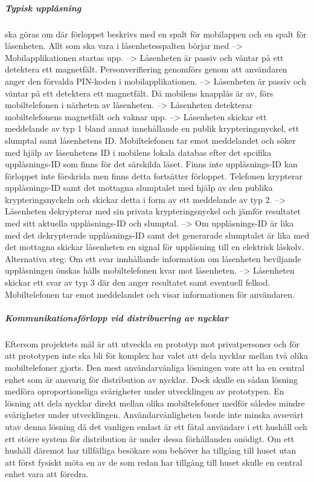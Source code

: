 \documentclass[11pt]{article}
\begin{document}
\subparagraph{Typisk upplåsning}
ska göras om där förloppet beskrivs med en spalt för mobilappen och en spalt för låsenheten. Allt som ska vara i låsenhetesspalten börjar med  --> 
Mobilapplikationen startas upp. --> Låsenheten är passiv och väntar på ett detektera ett magnetfält. 
Personverifiering genomförs genom att användaren anger den förvalda PIN-koden i mobilapplikationen. --> Låsenheten är passiv och väntar på ett detektera ett magnetfält. 
Då mobilens knapplås är av, förs mobiltelefonen i närheten av låsenheten. --> Låsenheten detekterar mobiltelefonens magnetfält och vaknar upp.
 --> Låsenheten skickar ett meddelande av typ 1 bland annat innehållande en publik krypteringsnyckel, ett slumptal samt låsenhetens ID.
Mobiltelefonen tar emot meddelandet och söker med hjälp av låsenhetens ID i mobilens lokala databas efter det spcifika upplåsnings-ID som finns för det särskilda låset.
Finns inte upplåsnings-ID kan förloppet inte förskrida men finns detta fortsätter förloppet.
Telefonen krypterar upplåsnings-ID samt det mottagna slumptalet med hjälp av den publika krypteringsnyckeln och skickar detta i form av ett meddelande av typ 2.
 --> Låsenheten dekrypterar med sin privata krypteringsnyckel och jämför resultatet med sitt aktuella upplåsnings-ID och slumptal.
 --> Om upplåsnings-ID är lika med det dekrypterade upplåsnings-ID samt det generarade slumptalet är lika med det mottagna  skickar låsenheten en signal för upplåsning till en elektrisk låskolv.
Alternativa steg:
Om ett svar innhållande information om låsenheten beviljande upplåsningen önskas hålls mobiltelefonen kvar mot låsenheten.
 --> Låsenheten skickar ett svar av typ 3 där den anger resultatet samt eventuell felkod.
Mobiltelefonen tar emot meddelandet och visar informationen för användaren.

\subparagraph{Kommunikationsförlopp vid distribuering av nycklar}
Eftersom projektets mål är att utveckla en prototyp mot privatpersoner och för att prototypen inte ska bli för komplex har valet att dela nycklar mellan två olika mobiltelefoner gjorts. Den mest användarvänliga lösningen vore att ha en central enhet som är ansvarig för distribution av nycklar. Dock skulle en sådan lösning medföra oproportioneliga svårigheter under utvecklingen av prototypen. En lösning att dela nycklar direkt mellan olika mobiltelefoner medför således mindre svårigheter under utvecklingen. Användarvänligheten borde inte minska avsevärt utav denna lösning då det vanligen endast är ett fåtal användare i ett hushåll och ett större system för distribution är under dessa förhållanden onödigt. Om ett hushåll däremot har tillfälliga besökare som behöver ha tillgång till huset utan att först fysiskt möta en av de som redan har tillgång till huset skulle en central enhet vara att föredra.
\end{document}
